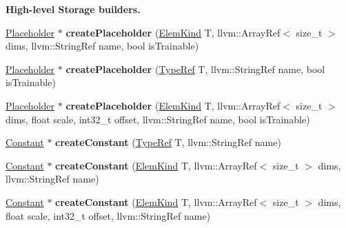 \begin{Indent}\textbf{ High-\/level Storage builders.}\par
\begin{DoxyCompactItemize}
\item 
\mbox{\label{classglow_1_1_module_a947846775848c7a9176deda31efaf06c}} 
\hyperlink{classglow_1_1_placeholder}{Placeholder} $\ast$ {\bfseries create\+Placeholder} (\hyperlink{namespaceglow_ab92e14a94329daf4083db670e95fbcdf}{Elem\+Kind} T, llvm\+::\+Array\+Ref$<$ size\+\_\+t $>$ dims, llvm\+::\+String\+Ref name, bool is\+Trainable)
\item 
\mbox{\label{classglow_1_1_module_a168c818666b4fb33fcdd4c8374b413ea}} 
\hyperlink{classglow_1_1_placeholder}{Placeholder} $\ast$ {\bfseries create\+Placeholder} (\hyperlink{structglow_1_1_type}{Type\+Ref} T, llvm\+::\+String\+Ref name, bool is\+Trainable)
\item 
\mbox{\label{classglow_1_1_module_a311324d19c77e411f59e9a568902727b}} 
\hyperlink{classglow_1_1_placeholder}{Placeholder} $\ast$ {\bfseries create\+Placeholder} (\hyperlink{namespaceglow_ab92e14a94329daf4083db670e95fbcdf}{Elem\+Kind} T, llvm\+::\+Array\+Ref$<$ size\+\_\+t $>$ dims, float scale, int32\+\_\+t offset, llvm\+::\+String\+Ref name, bool is\+Trainable)
\item 
\mbox{\label{classglow_1_1_module_a980dd0c05b2f8c65e89c2f2c926c58bc}} 
\hyperlink{classglow_1_1_constant}{Constant} $\ast$ {\bfseries create\+Constant} (\hyperlink{structglow_1_1_type}{Type\+Ref} T, llvm\+::\+String\+Ref name)
\item 
\mbox{\label{classglow_1_1_module_ad9e07b02bfae7fc49cafe2e1fafc698c}} 
\hyperlink{classglow_1_1_constant}{Constant} $\ast$ {\bfseries create\+Constant} (\hyperlink{namespaceglow_ab92e14a94329daf4083db670e95fbcdf}{Elem\+Kind} T, llvm\+::\+Array\+Ref$<$ size\+\_\+t $>$ dims, llvm\+::\+String\+Ref name)
\item 
\mbox{\label{classglow_1_1_module_ab14c253a054c889e19ec8e5aa1913d97}} 
\hyperlink{classglow_1_1_constant}{Constant} $\ast$ {\bfseries create\+Constant} (\hyperlink{namespaceglow_ab92e14a94329daf4083db670e95fbcdf}{Elem\+Kind} T, llvm\+::\+Array\+Ref$<$ size\+\_\+t $>$ dims, float scale, int32\+\_\+t offset, llvm\+::\+String\+Ref name)

\end{DoxyCompactItemize}
\end{Indent}
